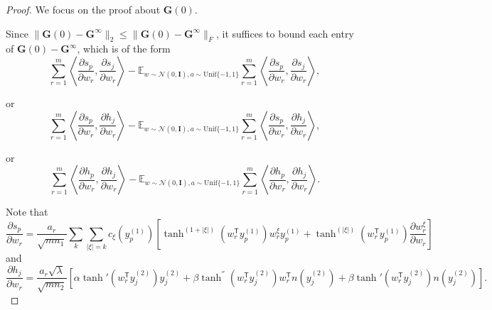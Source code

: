 \documentclass{article}
\newcommand{\T}{\mathsf{T}}
\begin{document}
\begin{proof}
We focus on the proof about $\mathbf{G}(0)$. 

Since \( \|\mathbf{G}(0) - \mathbf{G}^\infty\|_2 \leq \|\mathbf{G}(0) - \mathbf{G}^\infty\|_F \), it suffices to bound each entry of \( \mathbf{G}(0) - \mathbf{G}^\infty \), which is of the form
\begin{equation}
    \sum_{r=1}^m \left\langle \frac{\partial s_p}{\partial w_r}, \frac{\partial s_j}{\partial w_r} \right\rangle - \mathbb{E}_{w\sim\mathcal{N}(0,\mathbf{I}), a\sim \text{Unif}\{-1,1\}} \sum_{r=1}^m \left\langle \frac{\partial s_p}{\partial w_r}, \frac{\partial s_j}{\partial w_r} \right\rangle,\label{eq:form1}
\end{equation}

or
\begin{equation}
    \sum_{r=1}^m \left\langle \frac{\partial s_p}{\partial w_r}, \frac{\partial h_j}{\partial w_r} \right\rangle - \mathbb{E}_{w\sim\mathcal{N}(0,\mathbf{I}), a\sim \text{Unif}\{-1,1\}} \sum_{r=1}^m \left\langle \frac{\partial s_p}{\partial w_r}, \frac{\partial h_j}{\partial w_r} \right\rangle,\label{eq:form2}
\end{equation}

or
\begin{equation}
    \sum_{r=1}^m \left\langle \frac{\partial h_p}{\partial w_r}, \frac{\partial h_j}{\partial w_r} \right\rangle - \mathbb{E}_{w\sim\mathcal{N}(0,\mathbf{I}), a\sim \text{Unif}\{-1,1\}} \sum_{r=1}^m \left\langle \frac{\partial h_p}{\partial w_r}, \frac{\partial h_j}{\partial w_r} \right\rangle.\label{eq:form3}
\end{equation}

Note that
\begin{equation*}
    \frac{\partial s_p}{\partial w_r}=\frac{a_r}{\sqrt{mn_1}}\sum_{k}\sum_{|\xi|=k}c_{\xi}(y_p^{(1)})\left[\tanh^{(1+|\xi|)}(w_r^\T y_p^{(1)})w_r^{\xi}y_p^{(1)}+\tanh^{(|\xi|)}(w_r^\T y_p^{(1)})\frac{\partial w_r^\xi}{\partial w_r}\right]
\end{equation*}
and
\begin{equation*}
        \frac{\partial h_j}{\partial w_r}=\frac{a_r\sqrt{\lambda}}{\sqrt{mn_2}}\left[\alpha \tanh'(w_r^\T y_{j}^{(2)})y_{j}^{(2)}+\beta \tanh^{''}(w_r^\T y_{j}^{(2)})w_r^\T n(y_j^{(2)})+\beta \tanh'(w_r^\T y_{j}^{(2)})n(y_{j}^{(2)})\right].
\end{equation*}


\end{proof}
\end{document}
